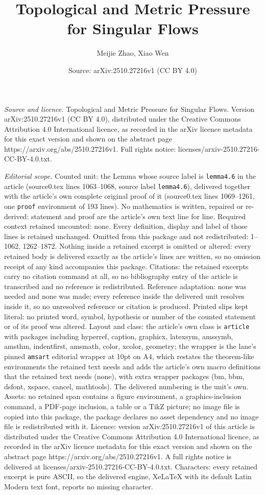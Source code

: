 \documentclass[10pt,a4paper]{amsart}
\title[Topological and Metric Pressure for Singular Flows]{Topological and Metric Pressure for Singular Flows}
\author{Meijie Zhao, Xiao Wen}
\date{Source: arXiv:2510.27216v1 (CC BY 4.0)}
\begin{document}
\maketitle

\noindent\emph{Source and licence.} Topological and Metric Pressure for Singular Flows. Version arXiv:2510.27216v1 (CC BY 4.0), distributed under the Creative Commons Attribution 4.0 International licence, as recorded in the arXiv licence metadata for this exact version and shown on the abstract page https://arxiv.org/abs/2510.27216v1. Full rights notice: licenses/arxiv-2510.27216-CC-BY-4.0.txt.\par\smallskip

\noindent\textit{Editorial scope.} Counted unit: the Lemma whose source label is \texttt{lemma4.6} in the article (source0.tex lines 1063--1068, source label \texttt{lemma4.6}), delivered together with the article's own complete original proof of it (source0.tex lines 1069--1261, one \texttt{proof} environment of 193 lines). No mathematics is written, repaired or re-derived: statement and proof are the article's own text line for line. Required context retained uncounted: none. Every definition, display and label of those lines is retained unchanged. Omitted from this package and not redistributed: 1--1062, 1262--1872. Nothing inside a retained excerpt is omitted or altered: every retained body is delivered exactly as the article's lines are written, so no omission receipt of any kind accompanies this package. Citations: the retained excerpts carry no citation command at all, so no bibliography entry of the article is transcribed and no reference is redistributed. Reference adaptation: none was needed and none was made; every reference inside the delivered unit resolves inside it, so no unresolved reference or citation is produced. Printed slips kept literal: no printed word, symbol, hypothesis or number of the counted statement or of its proof was altered. Layout and class: the article's own class is \texttt{article} with packages including hyperref, caption, graphicx, latexsym, amssymb, amsthm, indentfirst, amsmath, color, xcolor, geometry; the wrapper is the lane's pinned \texttt{amsart} editorial wrapper at 10pt on A4, which restates the theorem-like environments the retained text needs and adds the article's own macro definitions that the retained text needs (none), with extra wrapper packages (bm, bbm, dsfont, xspace, cancel, mathtools). The delivered numbering is the unit's own. Assets: no retained span contains a figure environment, a graphics-inclusion command, a PDF-page inclusion, a table or a TikZ picture; no image file is copied into this package, the package declares no asset dependency and no image file is redistributed with it. Licence: version arXiv:2510.27216v1 of this article is distributed under the Creative Commons Attribution 4.0 International licence, as recorded in the arXiv licence metadata for this exact version and shown on the abstract page https://arxiv.org/abs/2510.27216v1. A full rights notice is delivered at licenses/arxiv-2510.27216-CC-BY-4.0.txt. Characters: every retained excerpt is pure ASCII, so the delivered engine, XeLaTeX with its default Latin Modern text font, reports no missing character.
\end{document}
